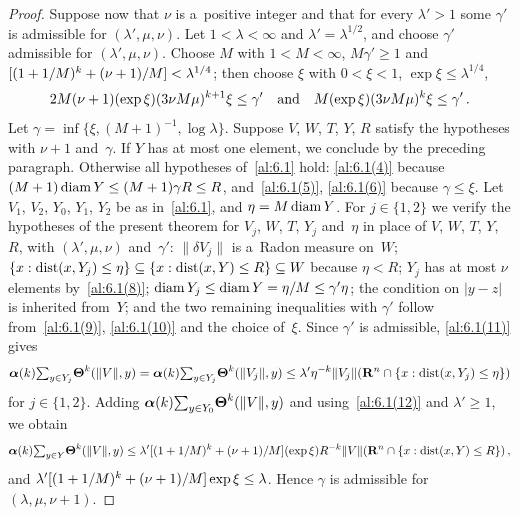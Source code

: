 \begin{proof}
    Suppose now that $\nu$ is a~positive integer and that for every $\lambda' > 1$ some
    $\gamma'$ is admissible for $(\lambda',\mu,\nu)$. Let $1 < \lambda < \infty$ and
    $\lambda' = \lambda^{1/2}$, and choose $\gamma'$ admissible for $(\lambda',\mu,\nu)$. Choose
    $M$ with $1 < M < \infty$, $M \gamma' \ge 1$ and $[(1 + 1/M)^{k} + (\nu+1)/M] <
    \lambda^{1/4}$; then choose $\xi$ with $0 < \xi < 1$, $\exp \xi \le \lambda^{1/4}$,
    \begin{displaymath}
        2 M (\nu+1) (\exp \xi) (3 \nu M \mu)^{k + 1} \xi \le \gamma' \quad \text{and} \quad M
        (\exp \xi) (3 \nu M \mu)^{k} \xi \le \gamma' \,.
    \end{displaymath}
    Let $\gamma = \inf \{ \xi, (M+1)^{-1}, \log \lambda \}$. Suppose $V$, $W$, $T$, $Y$, $R$
    satisfy the hypotheses with $\nu + 1$ and~$\gamma$. If $Y$ has at most one element, we
    conclude by the preceding paragraph. Otherwise all hypotheses of~\ref{al:6.1} hold:
    \ref{al:6.1(4)} because $(M+1) \operatorname{diam} Y \le (M+1) \gamma R \le R$, and~\ref{al:6.1(5)},
    \ref{al:6.1(6)} because $\gamma \le \xi$. Let $V_1$, $V_2$, $Y_0$, $Y_1$, $Y_2$ be as
    in~\ref{al:6.1}, and $\eta = M \operatorname{diam} Y$. For $j \in \{1,2\}$ we verify the hypotheses of the
    present theorem for $V_j$, $W$, $T$, $Y_j$ and~$\eta$ in place of $V$, $W$, $T$, $Y$, $R$,
    with $(\lambda', \mu, \nu)$ and~$\gamma'$: $\|\delta V_j\|$ is a~Radon measure on~$W$; $\{ x :
    \operatorname{dist}(x,Y_j) \le \eta \} \subseteq \{ x : \operatorname{dist}(x,Y) \le R \} \subseteq W$ because $\eta <
    R$; $Y_j$ has at most $\nu$ elements by~\ref{al:6.1(8)}; $\operatorname{diam} Y_j \le \operatorname{diam} Y = \eta/M \le
    \gamma' \eta$; the condition on $|y - z|$ is inherited from~$Y$; and the two remaining
    inequalities with $\gamma'$ follow from~\ref{al:6.1(9)}, \ref{al:6.1(10)} and the choice
    of~$\xi$. Since $\gamma'$ is admissible, \ref{al:6.1(11)} gives
    \begin{displaymath}
        \boldsymbol{\alpha}(k) {\textstyle\sum_{y \in Y_j}^{}} \boldsymbol{\Theta}^{k}(\|V\|,y) =
        \boldsymbol{\alpha}(k) {\textstyle\sum_{y \in Y_j}^{}} \boldsymbol{\Theta}^{k}(\|V_j\|,y) \le \lambda'
        \eta^{-k} \|V_j\|(\mathbf{R}^{n} \cap \{ x : \operatorname{dist}(x,Y_j) \le \eta \})
    \end{displaymath}
    for $j \in \{1,2\}$. Adding $\boldsymbol{\alpha}(k) {\textstyle\sum_{y \in Y_0}^{}}
    \boldsymbol{\Theta}^{k}(\|V\|,y)$ and using~\ref{al:6.1(12)} and $\lambda' \ge 1$, we obtain
    \begin{displaymath}
        \boldsymbol{\alpha}(k) {\textstyle\sum_{y \in Y}^{}} \boldsymbol{\Theta}^{k}(\|V\|,y) \le \lambda' [(1 +
        1/M)^{k} + (\nu+1)/M] (\exp \xi) R^{-k} \|V\|(\mathbf{R}^{n} \cap \{ x : \operatorname{dist}(x,Y)
        \le R \}) \,,
    \end{displaymath}
    and $\lambda' [(1 + 1/M)^{k} + (\nu+1)/M] \exp \xi \le \lambda$. Hence $\gamma$ is
    admissible for $(\lambda,\mu,\nu+1)$.
\end{proof}

